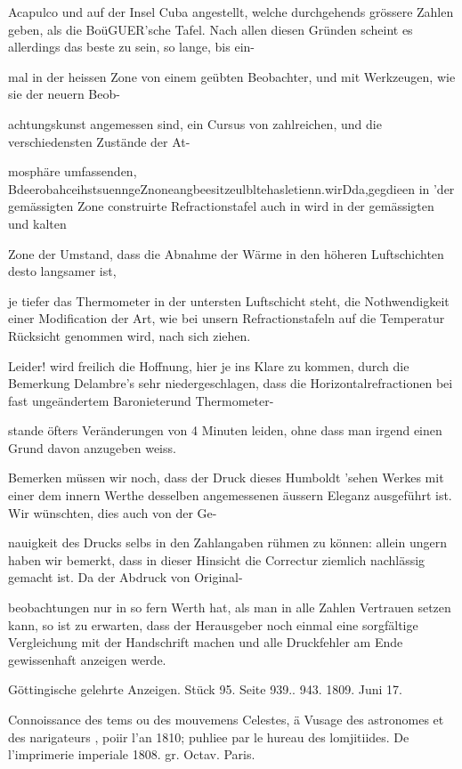 \documentclass[10pt,a4paper]{article}
\begin{document}
Acapulco und auf der Insel Cuba angestellt, welche durchgehends grössere Zahlen geben, als die BoüGUER'sche Tafel. Nach allen diesen Gründen scheint es allerdings das beste zu sein, so lange, bis ein-

mal in der heissen Zone von einem geübten Beobachter, und mit Werkzeugen, wie sie der neuern Beob-

achtungskunst angemessen sind, ein Cursus von zahlreichen, und die verschiedensten Zustände der At-

mosphäre umfassenden, BdeerobahceihstsuenngeZnoneangbeesitzeulbltehasletienn.wirDda,gegdieen in 'der gemässigten Zone construirte Refractionstafel auch in wird in der gemässigten und kalten

Zone der Umstand, dass die Abnahme der Wärme in den höheren Luftschichten desto langsamer ist,

je tiefer das Thermometer in der untersten Luftschicht steht, die Nothwendigkeit einer Modification der Art, wie bei unsern Refractionstafeln auf die Temperatur Rücksicht genommen wird, nach sich ziehen.

Leider! wird freilich die Hoffnung, hier je ins Klare zu kommen, durch die Bemerkung Delambre's sehr niedergeschlagen, dass die Horizontalrefractionen bei fast ungeändertem Baronieterund Thermometer-

stande öfters Veränderungen von 4 Minuten leiden, ohne dass man irgend einen Grund davon anzugeben weiss.

Bemerken müssen wir noch, dass der Druck dieses Humboldt 'sehen Werkes mit einer dem innern Werthe desselben angemessenen äussern Eleganz ausgeführt ist. Wir wünschten, dies auch von der Ge-

nauigkeit des Drucks selbs in den Zahlangaben rühmen zu können: allein ungern haben wir bemerkt, dass in dieser Hinsicht die Correctur ziemlich nachlässig gemacht ist. Da der Abdruck von Original-

beobachtungen nur in so fern Werth hat, als man in alle Zahlen Vertrauen setzen kann, so ist zu erwarten, dass der Herausgeber noch einmal eine sorgfältige Vergleichung mit der Handschrift machen und alle Druckfehler am Ende gewissenhaft anzeigen werde.

Göttingische gelehrte Anzeigen. Stück 95. Seite 939.. 943. 1809. Juni 17.

Connoissance des tems ou des mouvemens Celestes, ä Vusage des astronomes et des narigateurs , poiir l'an 1810; puhliee par le hureau des lomjitiides. De l'imprimerie imperiale 1808. gr. Octav. Paris.
\end{document}
